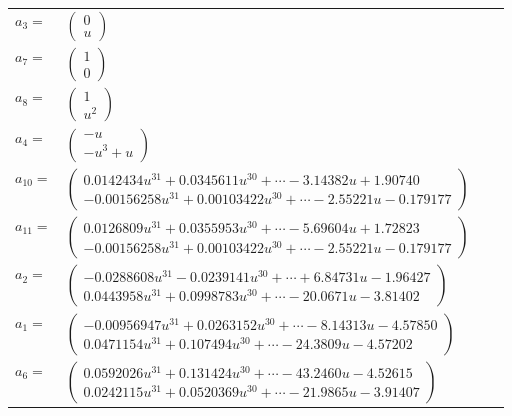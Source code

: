 \documentclass[1p]{elsarticle_modified}
\theoremstyle{definition}
\begin{document}
\begin{tabular}{m{7pt} m{180pt} m{7pt} m{180pt} }
\flushright $a_{3}=$&$\begin{pmatrix}0\\u\end{pmatrix}$ \\
\flushright $a_{7}=$&$\begin{pmatrix}1\\0\end{pmatrix}$ \\
\flushright $a_{8}=$&$\begin{pmatrix}1\\u^2\end{pmatrix}$ \\
\flushright $a_{4}=$&$\begin{pmatrix}- u\\- u^3+u\end{pmatrix}$ \\
\flushright $a_{10}=$&$\begin{pmatrix}0.0142434 u^{31}+0.0345611 u^{30}+\cdots-3.14382 u+1.90740\\-0.00156258 u^{31}+0.00103422 u^{30}+\cdots-2.55221 u-0.179177\end{pmatrix}$ \\
\flushright $a_{11}=$&$\begin{pmatrix}0.0126809 u^{31}+0.0355953 u^{30}+\cdots-5.69604 u+1.72823\\-0.00156258 u^{31}+0.00103422 u^{30}+\cdots-2.55221 u-0.179177\end{pmatrix}$ \\
\flushright $a_{2}=$&$\begin{pmatrix}-0.0288608 u^{31}-0.0239141 u^{30}+\cdots+6.84731 u-1.96427\\0.0443958 u^{31}+0.0998783 u^{30}+\cdots-20.0671 u-3.81402\end{pmatrix}$ \\
\flushright $a_{1}=$&$\begin{pmatrix}-0.00956947 u^{31}+0.0263152 u^{30}+\cdots-8.14313 u-4.57850\\0.0471154 u^{31}+0.107494 u^{30}+\cdots-24.3809 u-4.57202\end{pmatrix}$ \\
\flushright $a_{6}=$&$\begin{pmatrix}0.0592026 u^{31}+0.131424 u^{30}+\cdots-43.2460 u-4.52615\\0.0242115 u^{31}+0.0520369 u^{30}+\cdots-21.9865 u-3.91407\end{pmatrix}$ \\

\end{tabular}
\end{document}
